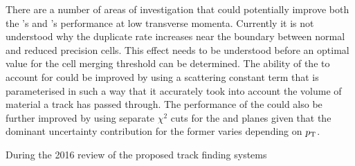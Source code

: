 There are a number of areas of investigation that could potentially improve both the \HT's and \KF's performance at low  transverse momenta.
Currently it is not understood why the duplicate rate increases near the boundary between normal and reduced precision \HT cells.
This effect needs to be understood before an optimal value for the cell merging threshold can be determined.
The ability of the \KF to account for \MS could be improved by using a scattering constant term that is parameterised in such a way that it accurately took into account the volume of material a track has passed through.
The performance of the \KF could also be further improved by using separate \KF $\chi^{2}$ cuts for the \rphi and \rz planes given that the dominant uncertainty contribution for the former varies depending on $p_{\mathrm{T}}$.

During the 2016 review of the proposed track finding systems 